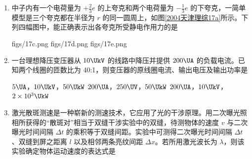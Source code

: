 \documentclass[\gkver]{gaokaozhenti}
\begin{document}
\begin{enumerate}
\item
中子内有一个电荷量为 $+ \frac{2}{3}e$ 的上夸克和两个电荷量为 $- \frac{1}{3}e$ 的下夸克，一简单模型是三个夸克都在半径为 $r$ 的同一圆周上，如图\ref{2004天津理综17a}所示。下列四幅图中，能正确表示出各夸克所受静电作用力的是

\onepicture[num=1, numstyle=arabic, labelprefix={图}, label=2004天津理综17a, w=4.66cm]{}
{figs/17c.png}
{figs/17d.png}
{figs/17e.png}

\item
一台理想降压变压器从 $10\UkV$ 的线路中降压并提供 $200\UA$ 的负载电流。已知两个线圈的匝数比为 40:1，则变压器的原线圈电流、输出电压及输出功率是

{$5\UA$，$10\UkV$，$50\UkW$}
{$200\UA$，$250\UV$，$50\UkW$}
{$200\UA$，$10\UkV$，$2\times10^{3}\UkW$}

\item
激光散斑测速是一种崭新的测速技术，它应用了光的干涉原理。用二次曝光照相所获得的“散斑对”相当于双缝干涉实验中的双缝，待测物体的速度 $v$ 与二次曝光时间间隔 $\Delta t$ 的乘积等于双缝间距。实验中可测得二次曝光时间间隔 $\Delta t$、双缝到屏之距离 $l$ 以及相邻两条亮纹间距 $\Delta x$。若所用激光波长为 $\lambda$，则该实验确定物体运动速度的表达式是


\end{enumerate}
\end{document}
